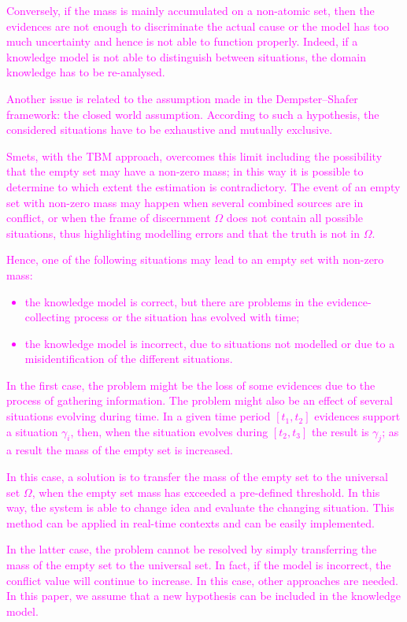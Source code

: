 \documentclass[journal]{IEEEtran}
\newcommand{\GO}[1]{\textcolor{magenta}{{#1}}}
\begin{document}
\GO{Conversely, if the mass is mainly accumulated on a non-atomic set, then the evidences are not enough to discriminate the actual cause or the model has too much uncertainty and hence is not able to function properly. Indeed, if a knowledge model is not able to distinguish between situations, the domain knowledge has to be re-analysed.}

\GO{Another issue is related to the assumption made in the Dempster--Shafer framework: the closed world assumption. According to such a hypothesis, the considered situations have to be exhaustive and mutually exclusive.}

\GO{Smets, with the TBM approach, overcomes this limit including the possibility that the empty set may have a non-zero mass; in this way it is possible to determine to which extent the estimation is contradictory. The event of an empty set with non-zero mass may happen when several combined sources are in conflict, or when the frame of discernment $\Omega$ does not contain all possible situations, thus highlighting modelling errors and that the truth is not in $\Omega$.}

\GO{Hence, one of the following situations may lead to an empty set with non-zero mass:
\begin{itemize}
\item the knowledge model is correct, but there are problems in the evidence-collecting process or the situation has evolved with time;
\item the knowledge model is incorrect, due to situations not modelled or due to a misidentification of the different situations.
\end{itemize}
}

\GO{In the first case, the problem might be the loss of some evidences due to the process of gathering information. The problem might also be an effect of several situations evolving during time. In a given time period $\left[ t_1,t_2\right]$ evidences support a situation $\gamma_i$, then, when the situation evolves during $\left[ t_2, t_3\right]$ the result is $\gamma_j$; as a result the mass of the empty set is increased.}

\GO{In this case, a solution is to transfer the mass of the empty set to the universal set $\Omega$, when the empty set mass has exceeded a pre-defined threshold. In this way, the system is able to change idea and evaluate the changing situation. This method can be applied in real-time contexts and can be easily implemented.}

\GO{In the latter case, the problem cannot be resolved by simply transferring the mass of the empty set to the universal set. In fact, if the model is incorrect, the conflict value will continue to increase. In this case, other approaches are needed. In this paper, we assume that a new hypothesis can be included in the knowledge model.}
\end{document}
